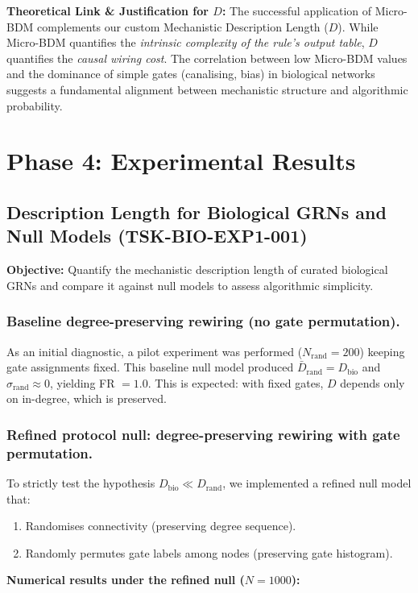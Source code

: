 \documentclass{article}
\begin{document}
\textbf{Theoretical Link \& Justification for $D$:}
The successful application of Micro-BDM complements our custom Mechanistic Description Length ($D$). While Micro-BDM quantifies the \textit{intrinsic complexity of the rule's output table}, $D$ quantifies the \textit{causal wiring cost}. The correlation between low Micro-BDM values and the dominance of simple gates (canalising, bias) in biological networks suggests a fundamental alignment between mechanistic structure and algorithmic probability.

\section{Phase 4: Experimental Results}

\subsection{Description Length for Biological GRNs and Null Models (TSK-BIO-EXP1-001)}
\textbf{Objective:} Quantify the mechanistic description length of curated biological GRNs and compare it against null models to assess algorithmic simplicity.

\subsubsection{Baseline degree-preserving rewiring (no gate permutation).}
As an initial diagnostic, a pilot experiment was performed ($N_{\text{rand}} = 200$) keeping gate assignments fixed. This baseline null model produced $\bar{D}_{\text{rand}} = D_{\text{bio}}$ and $\sigma_{\text{rand}} \approx 0$, yielding FR $= 1.0$. This is expected: with fixed gates, $D$ depends only on in-degree, which is preserved.

\subsubsection{Refined protocol null: degree-preserving rewiring with gate permutation.}
To strictly test the hypothesis $D_{\text{bio}} \ll D_{\text{rand}}$, we implemented a refined null model that:
\begin{enumerate}
    \item Randomises connectivity (preserving degree sequence).
    \item Randomly permutes gate labels among nodes (preserving gate histogram).
\end{enumerate}

\textbf{Numerical results under the refined null ($N=1000$):}
\end{document}
